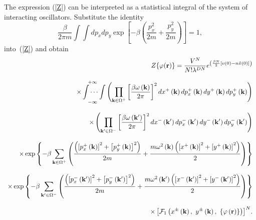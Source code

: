 \documentclass[aps,pre,preprint,floatfix,twoside,tightenlines,showpacs,
showkeys]{revtex4}
\begin{document}
The expression (\ref{Z}) can be interpreted as a statistical integral of the system of interacting oscillators. Substitute the identity 
%
\begin{equation}
\label{1}
\frac{\beta}{2\pi m}\int\int dp_{x}dp_{y}\exp\left[{-}\beta\left(\frac{p^{2}_{x}}{2m} + \frac{p^{2}_{y}}{2m}\right)\right] = 1,
\end{equation}
into~(\ref{Z}) and obtain
%
\begin{equation}
\label{ZZ}
\begin{array}{r}
{\displaystyle 
Z{\left\{  \varphi(\mathbf{r})\right\} } = \frac{V^{N}}{N!\lambda^{DN}} e^{\left( \frac{\beta N}{2} \left[v(0) - n\tilde{v}(0) \right] \right)}}\\ \\
{\displaystyle\times
\idotsint\limits_{-\infty}^{+\infty}\left(\prod\limits_{\mathbf{k}\in\Omega^{+}}\left[\frac{\beta\omega \left(\mathbf{k}\right)}{2\pi}\right]^{2}dx^{+}\left(\mathbf{k} \right)dp^{+}_{x}\left(\mathbf{k}\right)dy^{+}\left(\mathbf{k} \right)dp^{+}_{y}\left(\mathbf{k}\right)\right)}\\ \\
{\displaystyle\times
\left(\prod\limits_{\mathbf{k}'\in\Omega^{-}}\left[\frac{\beta\omega \left(\mathbf{k}'\right)}{2\pi}\right]^{2}dx^{-}\left(\mathbf{k}{'} \right)dp^{-}_{x}\left(\mathbf{k}'\right)dy^{-}\left(\mathbf{k}' \right)dp^{-}_{y}\left(\mathbf{k}'\right)\right)}\\ \\
{\displaystyle \times
\exp\left\{{-}\beta\sum\limits_{\mathbf{k}\in\Omega^{+}}\left(\frac{\left( \left[p^{+}_{x}\left(\mathbf{k}\right)\right]^{2} + \left[p^{+}_{y}\left(\mathbf{k}\right)\right]^{2}\right)}{2m} + \frac{m\omega^{2}\left(\mathbf{k}\right)\left(\left[x^{+}\left(\mathbf{k} \right) \right]^{2} + \left[y^{+}\left(\mathbf{k}\right)\right]^{2}\right)}{2}\right)\right\} }\\ \\
{\displaystyle\times
\exp\left\{{-}\beta\sum\limits_{\mathbf{k}'\in\Omega^{-}}\left(\frac{\left( \left[p^{-}_{x}\left(\mathbf{k}'\right)\right]^{2} + \left[p^{-}_{y}\left(\mathbf{k}'\right)\right]^{2}\right)}{2m} + \frac{m\omega^{2}\left(\mathbf{k}'\right)\left(\left[x^{-}\left( \mathbf{k}'\right)\right]^{2} + \left[y^{-}\left(\mathbf{k}'\right)\right]^{2}\right)}{2}\right)\right\}}\\ \\
{\displaystyle\times
\left[\mathcal{F}_{1}\left(x^{\pm}\left(\mathbf{k}\right),\ y^{\pm}\left(\mathbf{k}\right),\ \left\{\varphi\left(\mathbf{r}\right)\right\}\right)\right]^{N}}.
\end{array}
\end{equation}
\end{document}
